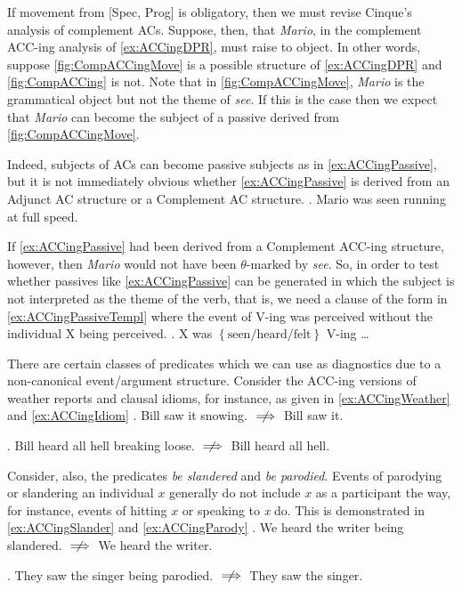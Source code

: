 \documentclass[MilwayThesis]{subfiles}
\begin{document}
If movement from [Spec, Prog] is obligatory, then we must revise Cinque's analysis of complement ACs.
Suppose, then, that \textit{Mario}, in the complement ACC-ing analysis of \cref{ex:ACCingDPR}, must raise to object.
In other words, suppose \cref{fig:CompACCingMove} is a possible structure of \cref{ex:ACCingDPR} and \cref{fig:CompACCing} is not.
Note that in \cref{fig:CompACCingMove}, \textit{Mario} is the grammatical object but not the theme of \textit{see}.
If this is the case then we expect that \textit{Mario} can become the subject of a passive derived from \cref{fig:CompACCingMove}.

Indeed, subjects of ACs can become passive subjects as in \cref{ex:ACCingPassive}, but it is not immediately obvious whether \cref{ex:ACCingPassive} is derived from an Adjunct AC structure or a Complement AC structure.
\ex. Mario was seen running at full speed. \label{ex:ACCingPassive}

If \cref{ex:ACCingPassive} had been derived from a Complement ACC-ing structure, however, then \textit{Mario} would not have been $\theta$-marked by \textit{see}.
So, in order to test whether passives like \cref{ex:ACCingPassive} can be generated in which the subject is not interpreted as the theme of the verb, that is, we need a clause of the form in \cref{ex:ACCingPassiveTempl} where the event of V-ing was perceived without the individual X being perceived.
\ex. X was $\left\{ \text{seen/heard/felt} \right\}$ V-ing \ldots\label{ex:ACCingPassiveTempl}

There are certain classes of predicates which we can use as diagnostics due to a non-canonical event/argument structure.
Consider the ACC-ing versions of weather reports and clausal idioms, for instance, as given in \cref{ex:ACCingWeather} and \cref{ex:ACCingIdiom}
\ex. Bill saw it snowing. $\centernot\implies$ Bill saw it. \label{ex:ACCingWeather}

\ex. Bill heard all hell breaking loose. $\centernot\implies$ Bill heard all hell. \label{ex:ACCingIdiom}

Consider, also, the predicates \textit{be slandered} and \textit{be parodied}.
Events of parodying or slandering an individual $x$ generally do not include $x$ as a participant the way, for instance, events of hitting $x$ or speaking to \textit{x} do.
This is demonstrated in \cref{ex:ACCingSlander} and \cref{ex:ACCingParody}
\ex. We heard the writer being slandered. $\centernot\implies$ We heard the writer. \label{ex:ACCingSlander}

\ex. They saw the singer being parodied. $\centernot\implies$ They saw the singer. \label{ex:ACCingParody}
\end{document}
